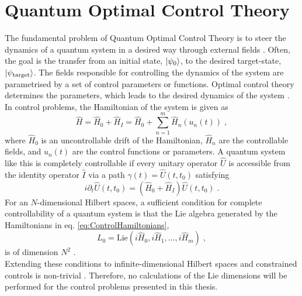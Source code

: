 \chapter{Quantum Optimal Control Theory}
The fundamental problem of Quantum Optimal Control Theory is to steer the dynamics of a quantum system in a desired way through external fields \cite{Rice2000,Shapiro2003}. Often, the goal is the transfer from an initial state, $\ket{\psi_0}$, to the desired target-state, $\ket{\psi_{\mathrm{target}}}$. The fields responsible for controlling the dynamics of the system are parametrised by a set of control parameters or functions. Optimal control theory determines the parameters, which leads to the desired dynamics of the system \cite{Werschnik2007}.\\ 
In control problems, the Hamiltonian of the system is given as
\begin{equation}
	\hat{H} = \hat{H}_0 + \hat{H}_I = \hat{H}_0 + \sum_{n = 1}^{m}  \hat{H}_n (u_n(t)) \; ,
	\label{eq:ControlHamiltonians}
\end{equation} 
where $\hat{H}_0$ is an uncontrollable drift of the Hamiltonian, $\hat{H}_n$ are the controllable fields, and $u_n(t)$ are the control functions or parameters. A quantum system like this is completely controllable if every unitary operator $\hat{U}$ is accessible from the identity operator $\hat{I}$ via a path $\gamma (t) = \hat{U}(t, t_0)$ satisfying \cite{Schirmer2001}
\begin{equation}
	i \partial_t \hat{U}(t, t_0) = \left( \hat{H}_0 + \hat{H}_I \right) \hat{U}(t, t_0) \; .
\end{equation} 
For an $N$-dimensional Hilbert spaces, a sufficient condition for complete controllability of a quantum system is that the Lie algebra generated by the Hamiltonians in eq. \eqref{eq:ControlHamiltonians},
\begin{equation}
	L_0 = \mathrm{Lie} \left( i \hat{H}_0, i \hat{H}_1 , \ldots , i \hat{H}_m \right) \; ,
\end{equation}
is of dimension $N^2$ \cite{Ramakrishna1995}.\\
Extending these conditions to infinite-dimensional Hilbert spaces and constrained controls is non-trivial \cite{Huang1983}. Therefore, no calculations of the Lie dimensions will be performed for the control problems presented in this thesis.


